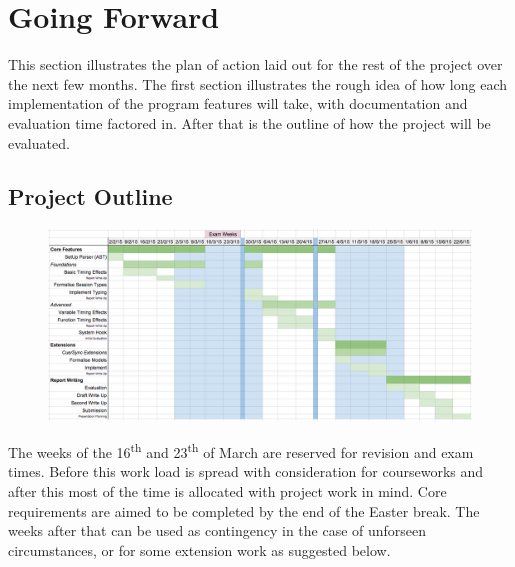 \documentclass[11pt]{scrartcl}
\begin{document}
\section{Going Forward}
This section illustrates the plan of action laid out for the rest of the 
project over the next few months. The first section illustrates the rough
idea of how long each implementation of the program features will take, 
with documentation and evaluation time factored in. After that is the 
outline of how the project will be evaluated.

\subsection{Project Outline}

\begin{figure}[ht]
	\centering
	\includegraphics[width=\textwidth]{images/gantt-two.png}
\end{figure}

The weeks of the 16\textsuperscript{th} and 23\textsuperscript{th} of March are reserved for revision and
exam times. Before this work load is spread with consideration for courseworks
and after this most of the time is allocated with project work in mind. Core
requirements are aimed to be completed by the end of the Easter break. The weeks 
after that can be used as contingency in the case of unforseen circumstances, or
for some extension work as suggested below.
\end{document}
